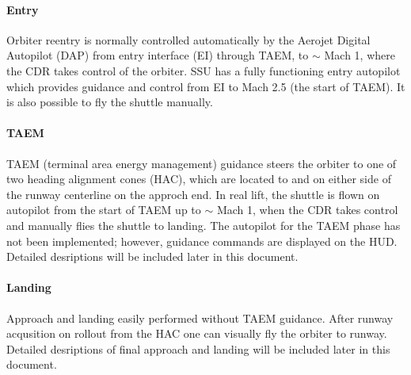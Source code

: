 \documentclass[13pt]{article}
\begin{document}
\begin{multicols}{2}
\paragraph{Entry}
Orbiter reentry is normally controlled automatically by the Aerojet Digital Autopilot (DAP) from entry interface (EI) through TAEM, to $\sim$ Mach 1, where the CDR takes control of the orbiter. SSU has a fully functioning entry autopilot which provides guidance and control from EI to Mach 2.5 (the start of TAEM). It is also possible to fly the shuttle manually.
\\
\paragraph{TAEM}
TAEM (terminal area energy management) guidance steers the orbiter to one of two heading alignment cones (HAC), which are located to and on either side of the runway centerline on the approch end. In real lift, the shuttle is flown on autopilot from the start of TAEM up to $\sim$ Mach 1, when the CDR takes control and manually flies the shuttle to landing. The autopilot for the TAEM phase has not been implemented; however, guidance commands are displayed on the HUD. Detailed desriptions will be included later in this document.
\\
\paragraph{Landing}
Approach and landing easily performed without TAEM guidance. After runway acqusition on rollout from the HAC one can visually fly the orbiter to runway. Detailed desriptions of final approach and landing will be included later in this document.\\


\end{multicols}
\end{document}
